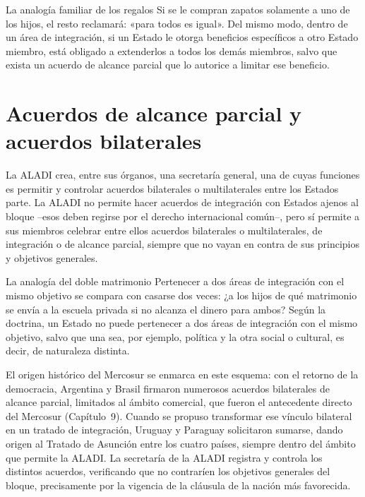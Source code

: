 \documentclass[12pt,oneside]{book}
\begin{document}
\begin{ejemplo}{La analogía familiar de los regalos}
Si se le compran zapatos solamente a uno de los hijos, el resto reclamará: «para todos es igual». Del mismo modo, dentro de un área de integración, si un Estado le otorga beneficios específicos a otro Estado miembro, está obligado a extenderlos a todos los demás miembros, salvo que exista un acuerdo de alcance parcial que lo autorice a limitar ese beneficio.
\end{ejemplo}

\section{Acuerdos de alcance parcial y acuerdos bilaterales}

La ALADI crea, entre sus órganos, una secretaría general, una de cuyas funciones es permitir y controlar acuerdos bilaterales o multilaterales entre los Estados parte. La ALADI no permite hacer acuerdos de integración con Estados ajenos al bloque --esos deben regirse por el derecho internacional común--, pero sí permite a sus miembros celebrar entre ellos acuerdos bilaterales o multilaterales, de integración o de alcance parcial, siempre que no vayan en contra de sus principios y objetivos generales.

\begin{ejemplo}{La analogía del doble matrimonio}
Pertenecer a dos áreas de integración con el mismo objetivo se compara con casarse dos veces: ¿a los hijos de qué matrimonio se envía a la escuela privada si no alcanza el dinero para ambos? Según la doctrina, un Estado no puede pertenecer a dos áreas de integración con el mismo objetivo, salvo que una sea, por ejemplo, política y la otra social o cultural, es decir, de naturaleza distinta.
\end{ejemplo}

El origen histórico del Mercosur se enmarca en este esquema: con el retorno de la democracia, Argentina y Brasil firmaron numerosos acuerdos bilaterales de alcance parcial, limitados al ámbito comercial, que fueron el antecedente directo del Mercosur (Capítulo~9). Cuando se propuso transformar ese vínculo bilateral en un tratado de integración, Uruguay y Paraguay solicitaron sumarse, dando origen al Tratado de Asunción entre los cuatro países, siempre dentro del ámbito que permite la ALADI. La secretaría de la ALADI registra y controla los distintos acuerdos, verificando que no contraríen los objetivos generales del bloque, precisamente por la vigencia de la cláusula de la nación más favorecida.
\end{document}
